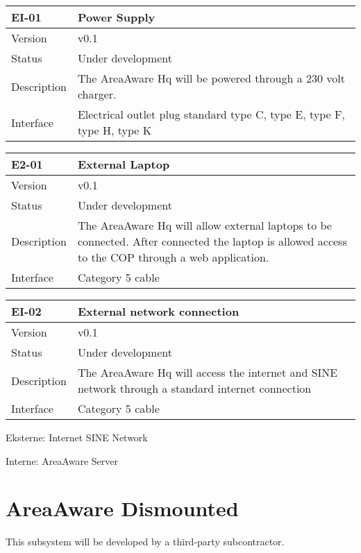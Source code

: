 \begin{longtable}{| p{3.5cm} |  p{10cm} | }
	\hline
	\textbf{EI-01} &  \textbf{Power Supply} \\
	\hline
	Version & v0.1 \\
	\hline
	Status & Under development \\
	\hline
	Description & The AreaAware Hq will be powered through a 230 volt charger.	\\
	\hline
	Interface &  Electrical outlet plug standard type C, type E,  type F,  type H, type K \\
	\hline
\end{longtable}

\begin{longtable}{| p{3.5cm} |  p{10cm} | }
	\hline
	\textbf{E2-01} &  \textbf{External Laptop} \\
	\hline
	Version & v0.1 \\
	\hline
	Status & Under development \\
	\hline
	Description & The AreaAware Hq will allow external laptops to be connected. After connected the laptop is allowed access to the COP through a web application.	\\
	\hline
	Interface & Category 5 cable \\
	\hline
\end{longtable}

\begin{longtable}{| p{3.5cm} |  p{10cm} | }
	\hline
	\textbf{EI-02} &  \textbf{External network connection} \\
	\hline
	Version & v0.1 \\
	\hline
	Status & Under development \\
	\hline
	Description & The AreaAware Hq will access the internet and SINE network through a standard internet connection	\\
	\hline
	Interface & Category 5 cable \\
	\hline
\end{longtable}



Eksterne:
Internet
SINE Network






Interne: 
AreaAware Server

\section{AreaAware Dismounted}
This subsystem will be developed by a third-party subcontractor.



